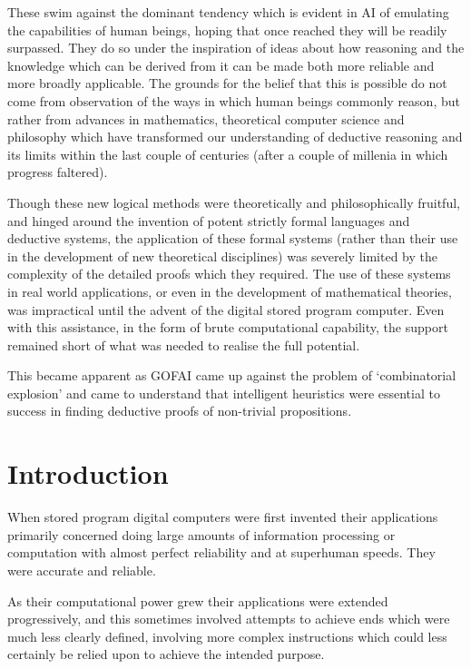 \documentclass[10pt,titlepage]{book}
\begin{document}
These swim against the dominant tendency which is evident in AI of emulating the capabilities of human beings, hoping that once reached they will be readily surpassed.
They do so under the inspiration of ideas about how reasoning and the knowledge which can be derived from it can be made both more reliable and more broadly applicable.
The grounds for the belief that this is possible do not come from observation of the ways in which human beings commonly reason, but rather from advances in mathematics, theoretical computer science and philosophy which have transformed our understanding of deductive reasoning and its limits within the last couple of centuries (after a couple of millenia in which progress faltered).

Though these new logical methods were theoretically and philosophically fruitful, and hinged around the invention of potent strictly formal languages and deductive systems, the application of these formal systems (rather than their use in the development of new theoretical disciplines) was severely limited by the complexity of the detailed proofs which they required.
The use of these systems in real world applications, or even in the development of mathematical theories, was impractical until the advent of the digital stored program computer.
Even with this assistance, in the form of brute computational capability, the support remained short of what was needed to realise the full potential.

This became apparent as GOFAI came up against the problem of `combinatorial explosion' and came to understand that intelligent heuristics were essential to success in finding deductive proofs of non-trivial propositions.

\section{Introduction}

When stored program digital computers were first invented their applications primarily concerned doing large amounts of information processing or computation with almost perfect reliability and at superhuman speeds.
They were accurate and reliable.

As their computational power grew their applications were extended progressively, and this sometimes involved attempts to achieve ends which were much less clearly defined, involving more complex instructions which could less certainly be relied upon to achieve the intended purpose.
\end{document}
